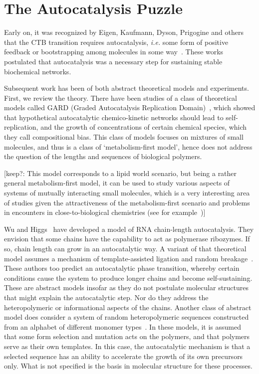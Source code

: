 \documentclass[journal=jacsat,manuscript=article,layout=twocolumn]{achemso}
\begin{document}
 \section{The Autocatalysis Puzzle}
 
 Early on, it was recognized by Eigen, Kaufmann, Dyson, Prigogine and others that the CTB transition requires autocatalysis, \emph{i.e.} some form of positive feedback or bootstrapping among molecules in some way~\cite{Eigen1978,Dyson1985,Prigogine1989,Kauffman1986}.  These works postulated that autocatalysis was a necessary step for sustaining stable biochemical networks.  
 
 Subsequent work has been of both abstract theoretical models and experiments.  First, we review the theory.  There have been studies of a class of theoretical models called GARD (Graded Autocatalysis Replication Domain)~\cite{segre1998graded,Segre2000,Markovitch2012}, which showed that hypothetical autocatalytic chemico-kinetic networks should lead to self-replication, and the growth of concentrations of certain chemical species, which they call compositional bias.  This class of models focuses on mixtures of small molecules, and thus is a class of `metabolism-first model', hence does not address the question of the lengths and sequences of biological polymers.
 
 [keep?:  This model corresponds to a lipid world scenario, but being a rather general metabolism-first model, it can be used to study various aspects of systems of mutually interacting small molecules, which is a very interesting area of studies given the attractiveness of the metabolism-first scenario and problems 
in encounters in close-to-biological chemistries (see for example~\cite{Orgel2008a})]

Wu and Higgs~\cite{Wu2009} have developed a model of RNA chain-length autocatalysis.  They envision that some chains have the capability to act as polymerase ribozymes.  If so, chain length can grow in an autocatalytic way.  A variant of that theoretical model assumes a mechanism of template-assisted ligation and random breakage~\cite{Tkachenko2014}.  These authors too predict an autocatalytic phase transition, whereby certain conditions cause the system to produce longer chains and become self-sustaining.  These are abstract models insofar as they do not postulate molecular structures that might explain the autocatalytic step.  Nor do they address the heteropolymeric or informational aspects of the chains.  Another class of abstract model does consider a system of random heteropolymeric sequences constructed from an alphabet of different monomer types~\cite{nowak2008prevolutionary,Ohtsuki2009,Chen2012,Derr2012}.  In these models, it is assumed that some form selection and mutation acts on the polymers, and that polymers serve as their own templates.  In this case, the autocatalytic mechanism is that a selected sequence has an ability to accelerate the growth of its own precursors only.  What is not specified is the basis in molecular structure for these processes.
 
\end{document}
